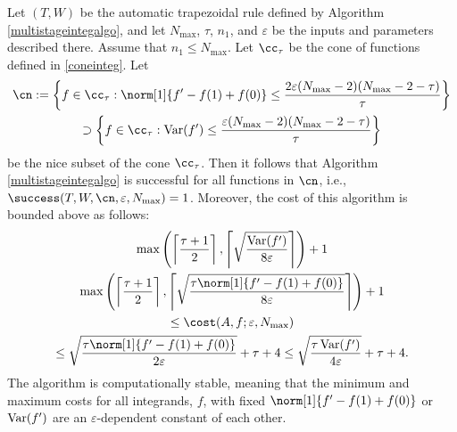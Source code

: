 \begin{theorem} \label{multistageintegthm} Let $(T,W)$ be the automatic trapezoidal rule defined by Algorithm \ref{multistageintegalgo}, and let  $N_{\max}$, $\tau$, $n_1$, and $\varepsilon$ be the inputs and parameters described there.  Assume that $n_1 \le N_{\max}$.  Let $\cc_\tau$ be the cone of functions defined in \eqref{coneinteg}.  Let
\begin{multline*}
\cn
:= \left \{ f \in \cc_\tau : \norm[1]{f'-f(1)+f(0)} \le \frac{2\varepsilon (N_{\max}-2)(N_{\max}-2 -\tau)}{\tau} \right\} \\
\supset \left \{ f \in \cc_\tau : \Var(f') \le \frac{\varepsilon (N_{\max}-2)(N_{\max}-2 -\tau)}{\tau} \right\}
\end{multline*}
be the nice subset of the cone $\cc_\tau$.  Then it follows that Algorithm \ref{multistageintegalgo} is successful for all functions in $\cn$,  i.e.,  $\success(T,W,\cn,\varepsilon,N_{\max}) = 1$.  Moreover, the cost of this algorithm is bounded above as follows:
\begin{multline}
\max \left(\left \lceil\frac{\tau+1}{2} \right \rceil, \left \lceil \sqrt{\frac{ \Var(f')}{8\varepsilon}} \right \rceil \right) +1 \\
\max \left(\left \lceil\frac{\tau+1}{2} \right \rceil, \left \lceil \sqrt{\frac{\tau \norm[1]{f'-f(1)+f(0)}}{8\varepsilon}} \right \rceil \right) +1 \\
\le
\cost(A,f;\varepsilon,N_{\max}) \\
\le \sqrt{\frac{\tau \norm[1]{f'-f(1)+f(0)}}{2\varepsilon}} + \tau + 4
\le \sqrt{\frac{\tau \Var(f') }{4\varepsilon}} + \tau + 4.
\end{multline}
The algorithm is computationally stable, meaning that the minimum and maximum costs for all integrands, $f$, with fixed $\norm[1]{f'-f(1)+f(0)}$ or $\operatorname{Var}(f')$ are an $\varepsilon$-dependent constant of each other.
\end{theorem}


